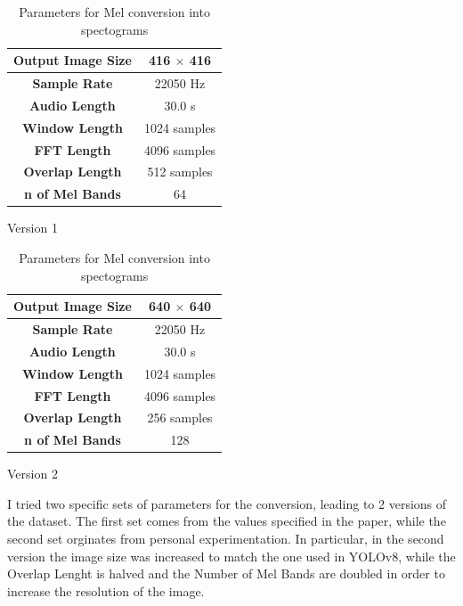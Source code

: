 \documentclass[a4paper,12pt]{article}
\begin{document}
\begin{table}[H]
	\centering
	\begin{subtable}[t]{0.45\textwidth}
		\centering
		\begin{tabular}{|c|c|}
			\hline
			\textbf{Output Image Size} & 416 $\times$ 416 \\
			\hline
			\textbf{Sample Rate} & 22050 Hz \\
			\hline
			\textbf{Audio Length} & 30.0 s \\
			\hline
			\textbf{Window Length} & 1024 samples \\
			\hline
			\textbf{FFT Length} & 4096 samples \\
			\hline
			\textbf{Overlap Length} & 512 samples \\
			\hline
			\textbf{n of Mel Bands} & 64 \\
			\hline
		\end{tabular}
		\caption{Version 1}
		\label{tab:config_a}
	\end{subtable}
	\hfill
	\begin{subtable}[t]{0.45\textwidth}
		\centering
		\begin{tabular}{|c|c|}
			\hline
			\textbf{Output Image Size} & 640 $\times$ 640 \\
			\hline
			\textbf{Sample Rate} & 22050 Hz \\
			\hline
			\textbf{Audio Length} & 30.0 s \\
			\hline
			\textbf{Window Length} & 1024 samples \\
			\hline
			\textbf{FFT Length} & 4096 samples \\
			\hline
			\textbf{Overlap Length} & 256 samples \\
			\hline
			\textbf{n of Mel Bands} & 128 \\
			\hline
		\end{tabular}
		\caption{Version 2}
		\label{tab:config_b}
	\end{subtable}
	\caption{Parameters for Mel conversion into spectograms}
	\label{tab:mel_params}
\end{table}

I tried two specific sets of parameters for the conversion, leading to 2 versions of the dataset. The first set comes from the values specified in the paper, while the second set orginates from personal experimentation. In particular, in the second version the image size was increased to match the one used in YOLOv8, while the Overlap Lenght is halved and the Number of Mel Bands are doubled in order to increase the resolution of the image.
\end{document}
